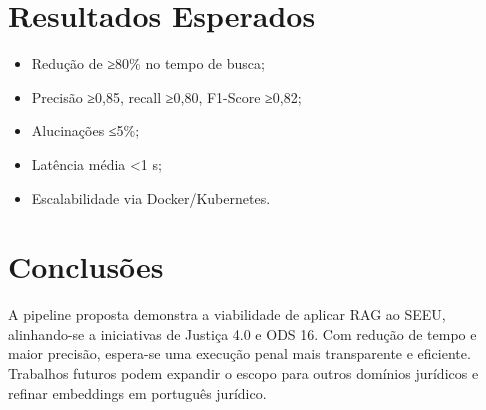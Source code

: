 
\chapter{Resultados Esperados}
\label{chap:resultados}

\begin{itemize}[label=\textbullet]
  \item Redução de ≥80\% no tempo de busca;
  \item Precisão ≥0,85, recall ≥0,80, F1-Score ≥0,82;
  \item Alucinações ≤5\%;
  \item Latência média <1 s;
  \item Escalabilidade via Docker/Kubernetes.
\end{itemize}


\chapter{Conclusões}
\label{chap:conclusoes}

A pipeline proposta demonstra a viabilidade de aplicar RAG ao SEEU, alinhando-se a iniciativas de Justiça 4.0 e ODS 16. Com redução de tempo e maior precisão, espera-se uma execução penal mais transparente e eficiente. Trabalhos futuros podem expandir o escopo para outros domínios jurídicos e refinar embeddings em português jurídico.